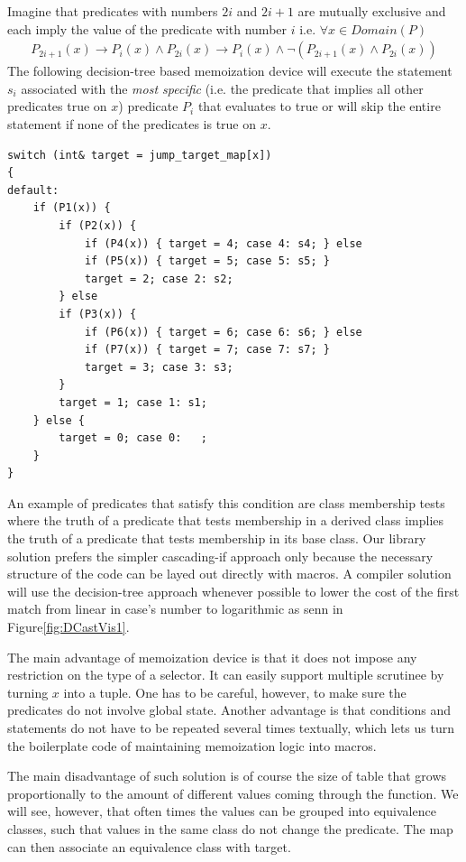 \documentclass[preprint]{sigplanconf}
\begin{document}
Imagine that predicates with numbers $2i$ and $2i+1$ are mutually exclusive and 
each imply the value of the predicate with number $i$ i.e. $\forall x \in Domain(P)$
\begin{eqnarray*}
P_{2i+1}(x)\rightarrow P_i(x) \wedge P_{2i}(x)\rightarrow P_i(x) \wedge \neg(P_{2i+1}(x) \wedge P_{2i}(x))
\end{eqnarray*}
\noindent
The following decision-tree based memoization device will execute the statement 
$s_i$ associated with the \emph{most specific} (i.e. the predicate that implies 
all other predicates true on $x$) predicate $P_i$ that evaluates to true or will 
skip the entire statement if none of the predicates is true on $x$.

\begin{lstlisting}
switch (int& target = jump_target_map[x])
{
default:
    if (P1(x)) {
        if (P2(x)) {
            if (P4(x)) { target = 4; case 4: s4; } else
            if (P5(x)) { target = 5; case 5: s5; } 
            target = 2; case 2: s2;
        } else
        if (P3(x)) {
            if (P6(x)) { target = 6; case 6: s6; } else
            if (P7(x)) { target = 7; case 7: s7; } 
            target = 3; case 3: s3;
        }
        target = 1; case 1: s1;
    } else {
        target = 0; case 0:   ;
    }
}
\end{lstlisting}

An example of predicates that satisfy this condition are class membership tests
where the truth of a predicate that tests membership in a derived class implies 
the truth of a predicate that tests membership in its base class. Our library 
solution prefers the simpler cascading-if approach only because the necessary 
structure of the code can be layed out directly with macros. A compiler solution 
will use the decision-tree approach whenever possible to lower the cost of the 
first match from linear in case's number to logarithmic as senn in Figure\ref{fig:DCastVis1}.

The main advantage of memoization device is that it does not impose any 
restriction on the type of a selector. It can easily support multiple scrutinee 
by turning $x$ into a tuple. One has to be careful, however, to make sure the 
predicates do not involve global state. Another advantage is that conditions and 
statements do not have to be repeated several times textually, which lets us 
turn the boilerplate code of maintaining memoization logic into macros.

The main disadvantage of such solution is of course the size of table that grows 
proportionally to the amount of different values coming through the function. We 
will see, however, that often times the values can be grouped into equivalence 
classes, such that values in the same class do not change the predicate. The map 
can then associate an equivalence class with target.
\end{document}
